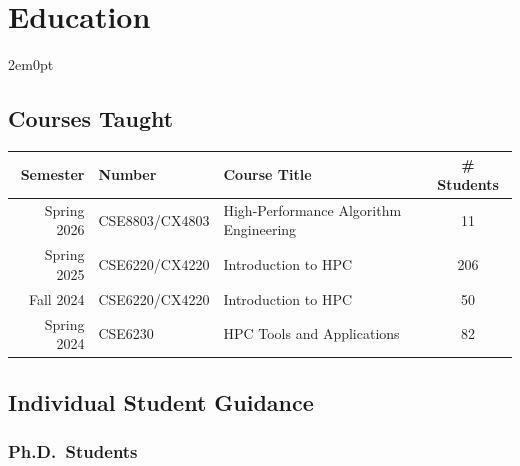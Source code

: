 \section{Education}
\begin{adjustwidth}{2em}{0pt}

\subsection{Courses Taught}

\begin{center}
    \begin{tabular}{ r l l c }
        \hline\hline
        \bf Semester  &\bf Number & \bf Course Title & \bf \# Students \\
        \hline
        Spring 2026 & CSE8803/CX4803 & High-Performance Algorithm Engineering & 11 \\
        Spring 2025 & CSE6220/CX4220 & Introduction to HPC & 206 \\
        Fall 2024 & CSE6220/CX4220 & Introduction to HPC & 50 \\
        Spring 2024 & CSE6230 & HPC Tools and Applications & 82 \\
        \hline\hline
    \end{tabular}
\end{center}

\subsection{Individual Student Guidance}


\subsubsection{Ph.D.\ Students}


\end{adjustwidth}
